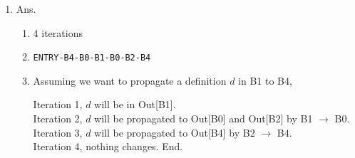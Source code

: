 \documentclass[11pt]{homework}
\begin{document}
\begin{enumerate}[label=(\alph*)]
\begin{multicols}{2}
\columnbreak
\begin{enumerate}[label=\roman*.]
    \item 3 iterations
    \item \texttt{ENTRY-B0-B1-B0-B2}
    \item Assuming we want to propagate a definition $d$ in B1 to B2,
    \begin{flushleft}
        Iteration 1, $d$ will be in Out[B1].\\
        Iteration 2, $d$ will be propagated to Out[B0] and Out[B2] by B1 $\to$ B0.\\
        Iteration 3, nothing changes. End.
    \end{flushleft}
\end{enumerate}
\end{multicols}    

\item Ans.

\begin{multicols}{2}
    \centering
    
    \columnbreak
    \begin{enumerate}[label=\roman*.]
        \item 4 iterations
        \item \texttt{ENTRY-B4-B0-B1-B0-B2-B4}
        \item Assuming we want to propagate a definition $d$ in B1 to B4,
        \begin{flushleft}
            Iteration 1, $d$ will be in Out[B1].\\
            Iteration 2, $d$ will be propagated to Out[B0] and Out[B2] by B1 $\to$ B0.\\
            Iteration 3, $d$ will be propagated to Out[B4] by B2 $\to$ B4.\\
            Iteration 4, nothing changes. End.
        \end{flushleft}
    \end{enumerate}
\end{multicols}


\end{enumerate}
\end{document}
